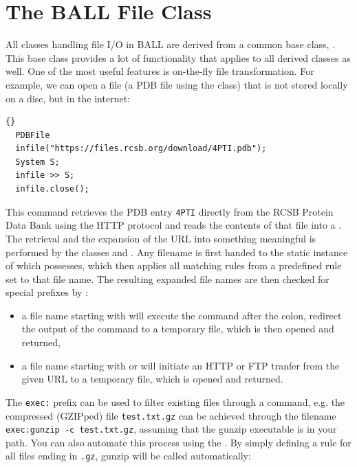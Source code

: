 \section{The BALL File Class}

All classes handling file I/O in BALL are derived from a common
base class, . This base class provides a lot of
functionality that applies to all derived classes as well.
One of the most useful features is on-the-fly file transformation.
For example, we can open a file (\eg a PDB file using the  
class) that is not stored locally on a disc, but in the internet:

\begin{lstlisting}{}
  PDBFile
  infile("https://files.rcsb.org/download/4PTI.pdb");
  System S;
  infile >> S;
  infile.close();
\end{lstlisting}

\noindent
This command retrieves the PDB entry {\tt 4PTI} directly from the RCSB Protein
Data Bank using the HTTP protocol and reads the contents of that file into a
. The retrieval and the expansion of the URL into something
meaningful is performed by the classes  and
. Any filename is first handed to the static instance of
 which  possesses, which then applies
all matching rules from a predefined rule set to that file name. The resulting
expanded file names are then checked for special prefixes by :
\begin{itemize}
  \item a file name starting with  will execute the command
        after the colon, redirect the output of the command to a temporary
        file, which is then opened and returned,

  \item a file name starting with  or  will
        initiate an HTTP or FTP tranfer from the given URL to a temporary file,
        which is opened and returned.
\end{itemize}

\noindent 
The {\tt exec:} prefix can be used to filter existing files through a command, 
e.g. the compressed (GZIPped) file {\tt test.txt.gz} can be achieved through
the filename {\tt exec:gunzip -c test.txt.gz}, assuming that the gunzip
executable is in your path. You can also automate this process using the
. By simply defining a rule for all files ending
in {\tt .gz}, gunzip will be called automatically:

